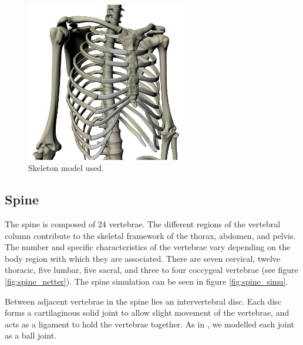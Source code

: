 \begin{figure}[h]
	\centering
	\includegraphics[height=7cm]{pics/skeleton}
	\caption[Skeleton model used]{\label{fig:skeleton}Skeleton model used.}
\end{figure}	

\subsection{\label{sec:spine}Spine}
The spine is composed of 24 vertebrae. The different regions of the vertebral column contribute to the skeletal framework of the thorax, abdomen, and pelvis. The number and specific characteristics of the vertebrae vary depending on the body region with which they are associated. There are seven cervical, twelve thoracic, five lumbar, five sacral, and three to four coccygeal vertebrae (see figure \ref{fig:spine_netter}). The spine simulation can be seen in figure \ref{fig:spine_simu}.

Between adjacent vertebrae in the spine lies an intervertebral disc. Each disc forms a cartilaginous solid joint to allow slight movement of the vertebrae, and acts as a ligament to hold the vertebrae together. As in \cite{dilorenzo2009breathing, veltkamp2009physiological, lee2008biomechanical}, we modelled each joint as a ball joint.

